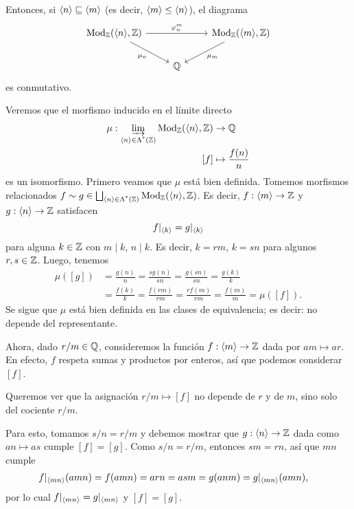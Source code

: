 Entonces, si $\langle n\rangle\sqsubseteq \langle m\rangle$ (es decir, $\langle m\rangle\leq\langle n\rangle$),
el diagrama
\[
    \begin{tikzcd}
      \Mod_\Z(\<n\>,\Z) \ar[rr,"{\phi_n^m}"] \ar[dr,"\mu_n"']
      && \Mod_\Z(\<m\>,\Z) \ar[dl,"\mu_m"] \\
      & \Q
    \end{tikzcd}
\]
es conmutativo.

Veremos que el morfismo inducido en el límite directo
\begin{align*}
    \mu : \varinjlim_{\langle n\rangle\in\Lambda^{\text{*}}({\mathbb Z})}\mathrm{Mod}_\mathbb Z(\langle n\rangle,\mathbb Z)
      &\to \mathbb Q \\
    [f] &\mapsto \frac{f(n)}{n}
\end{align*}
es un isomorfismo.
Primero veamos que $\mu$ está bien definida.
Tomemos morfismos relacionados
$f\sim g\in\bigsqcup_{\langle n\rangle\in\Lambda^{\text{*}}({\mathbb Z})}\mathrm{Mod}_\mathbb Z(\langle n\rangle,\mathbb Z)$.
Es decir, $f:\langle m\rangle\to\mathbb Z$ y $g:\langle n\rangle\to\mathbb Z$ satisfacen
\[
    f|_{\langle k\rangle} = g|_{\langle k\rangle}
\]
para alguna $k\in\mathbb Z$ con $m\mid k$, $n\mid k$.
Es decir, $k=rm$, $k=sn$ para algunos $r,s\in\mathbb Z$.
Luego, tenemos
\begin{align*}
    \mu([g])
    &= \frac {g(n)} n
    = \frac {sg(n)}{sn} 
    = \frac {g(sn)}{sn} 
    = \frac {g(k)}{k} \\
    &= \frac {f(k)}{k} 
    = \frac {f(rm)}{rm} 
    = \frac {rf(m)}{rm} 
    = \frac {f(m)}{m} 
    = \mu([f]).
\end{align*}
Se sigue que $\mu$ está bien definida
en las clases de equivalencia;
es decir: no depende del representante.

Ahora, dado $r/m\in\mathbb Q$, consideremos la función
$f:\langle m\rangle\to\mathbb Z$ dada por $am\mapsto ar$.
En efecto, $f$ respeta sumas y productos por enteros,
así que podemos considerar $[f]$.

Queremos ver que la asignación $r/m\mapsto [f]$ no
depende de $r$ y de $m$, sino solo del cociente $r/m$.

Para esto, tomamos $s/n=r/m$ y
debemos mostrar que $g:\langle n\rangle\to\mathbb Z$
dada como $an\mapsto as$ cumple $[f]=[g]$.
Como $s/n=r/m$, entonces $sm=rn$, así que $mn$ cumple
\begin{align*}
    f|_{\langle mn\rangle}(amn)
    &= f(amn)
    = arn
    = asm
    = g(anm)
    = g|_{\langle mn\rangle}(amn),
\end{align*}
por lo cual $f|_{\langle mn\rangle}=g|_{\langle mn\rangle}$ y $[f]=[g]$.

